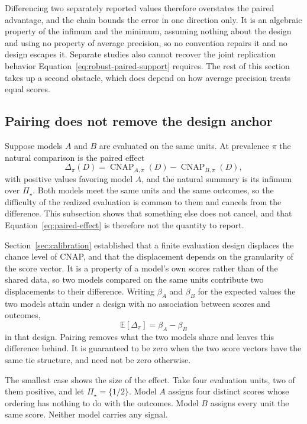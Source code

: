 \documentclass[11pt]{article}
\newcommand{\CNAP}{\operatorname{CNAP}}
\newcommand{\PSet}{\Pi_\star}
\newcommand{\E}{\mathbb{E}}
\theoremstyle{remark}
\begin{document}
Differencing two separately reported values therefore overstates the paired advantage, and the chain bounds the error in one direction only. It is an algebraic property of the infimum and the minimum, assuming nothing about the design and using no property of average precision, so no convention repairs it and no design escapes it. Separate studies also cannot recover the joint replication behavior Equation~\eqref{eq:robust-paired-support} requires. The rest of this section takes up a second obstacle, which does depend on how average precision treats equal scores.

\subsection{Pairing does not remove the design anchor}
\label{sec:paired-anchor}

Suppose models $A$ and $B$ are evaluated on the same units. At prevalence $\pi$ the natural comparison is the paired effect
\begin{equation}
\Delta_\pi(D)
=
\CNAP_{A,\pi}(D)
-
\CNAP_{B,\pi}(D),
\label{eq:paired-effect}
\end{equation}
with positive values favoring model $A$, and the natural summary is its infimum over $\PSet$. Both models meet the same units and the same outcomes, so the difficulty of the realized evaluation is common to them and cancels from the difference. This subsection shows that something else does not cancel, and that Equation~\eqref{eq:paired-effect} is therefore not the quantity to report.

Section~\ref{sec:calibration} established that a finite evaluation design displaces the chance level of CNAP, and that the displacement depends on the granularity of the score vector. It is a property of a model's own scores rather than of the shared data, so two models compared on the same units contribute two displacements to their difference. Writing $\beta_A$ and $\beta_B$ for the expected values the two models attain under a design with no association between scores and outcomes,
\[
\E[\Delta_\pi]
=
\beta_A-\beta_B
\]
in that design. Pairing removes what the two models share and leaves this difference behind. It is guaranteed to be zero when the two score vectors have the same tie structure, and need not be zero otherwise.

The smallest case shows the size of the effect. Take four evaluation units, two of them positive, and let $\PSet=\{1/2\}$. Model $A$ assigns four distinct scores whose ordering has nothing to do with the outcomes. Model $B$ assigns every unit the same score. Neither model carries any signal.
\end{document}
